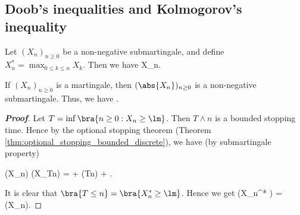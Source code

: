 \subsection{Doob's inequalities and Kolmogorov's inequality}

\begin{theorem}\label{thm:doob_maximal_inequality_discrete}
Let $(X_n)_{n \geq 0}$ be a non-negative submartingale, and define $X_n^* = \max_{0\leq k\leq n} X_k$. Then we have %
\be
\lm \pro{} \leq \E{} \leq \E X_n.
\ee
\end{theorem}

\begin{remark}
If $(X_n)_{n\geq 0}$ is a martingale, then $(\abs{X_n})_{n\geq 0}$ is a non-negative submartingale. Thus, we have
\be
\lm \pro{} \leq \E{} \leq \E{}.
\ee
\end{remark}


\begin{proof}[\bf Proof]
Let $T = \inf\bra{n \geq 0 :X_n \geq \lm}$. Then $T\land n$ is a bounded stopping time. Hence by the optional stopping theorem (Theorem \ref{thm:optional_stopping_bounded_discrete}), we have (by submartingale property)




\be
\E(X_n) \geq \E(X_{T\land n}) = \E{} + \E{} \geq \lm \pro(T\leq n) + \E{}.
\ee

It is clear that $\bra{T\leq n} = \bra{X_n^* \geq \lm}$. Hence we get
\be
\lm \pro(X_n^* \geq \lm) \leq \E {} = \E {} \leq \E(X_n).
\ee
\end{proof}

